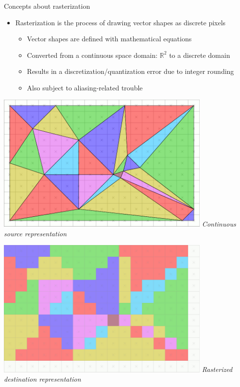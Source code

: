\begin{frame}{Concepts about rasterization}
  \begin{itemize}
  \item Rasterization is the process of drawing vector shapes as discrete pixels
    \begin{itemize}
    \item Vector shapes are defined with mathematical equations
    \item Converted from a continuous space domain: \(\mathbb{R}^2\) to a discrete domain
    \item Results in a discretization/quantization error due to integer rounding
    \item Also subject to aliasing-related trouble
    \end{itemize}
  \end{itemize}
  \vspace{1em}
  \begin{minipage}[b]{0.45\textwidth}
    \centering
    \includegraphics[width=0.8\textwidth]{slides/graphics-theory/raster-source.jpg}
    \textit{\small Continuous source representation}
  \end{minipage}
  \hfill
  \begin{minipage}[b]{0.45\textwidth}
    \centering
    \includegraphics[width=0.8\textwidth]{slides/graphics-theory/raster-destination.jpg}
    \textit{\small Rasterized destination representation}
  \end{minipage}
\end{frame}

